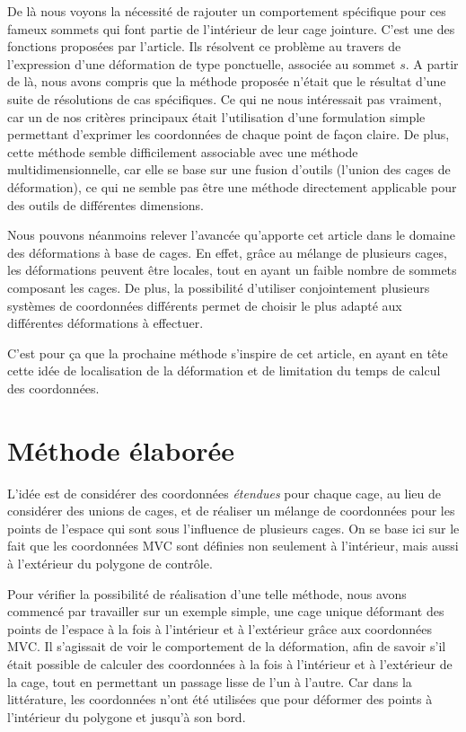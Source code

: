De là nous voyons la nécessité de rajouter un comportement spécifique
pour ces fameux sommets qui font partie de l'intérieur de leur cage
jointure. C'est une des fonctions proposées par l'article. Ils
résolvent ce problème au travers de l'expression d'une déformation de
type ponctuelle, associée au sommet $s$. A partir de là, nous avons
compris que la méthode proposée \cite{GPCP13} n'était que le résultat
d'une suite de résolutions de cas spécifiques. Ce qui ne nous
intéressait pas vraiment, car un de nos critères principaux était
l'utilisation d'une formulation simple permettant d'exprimer les
coordonnées de chaque point de façon claire. De plus, cette méthode
semble difficilement associable avec une méthode multidimensionnelle,
car elle se base sur une fusion d'outils (l'union des cages de
déformation), ce qui ne semble pas être une méthode directement
applicable pour des outils de différentes dimensions.

Nous pouvons néanmoins relever l'avancée qu'apporte cet article dans
le domaine des déformations à base de cages. En effet, grâce au
mélange de plusieurs cages, les déformations peuvent être locales,
tout en ayant un faible nombre de sommets composant les cages. De
plus, la possibilité d'utiliser conjointement plusieurs systèmes de
coordonnées différents permet de choisir le plus adapté aux
différentes déformations à effectuer.

C'est pour ça que la prochaine méthode s'inspire de cet article, en
ayant en tête cette idée de localisation de la déformation et de
limitation du temps de calcul des coordonnées.

\section{Méthode élaborée}
L'idée est de considérer des coordonnées \textit{étendues} pour chaque
cage, au lieu de considérer des unions de cages, et de réaliser un
mélange de coordonnées pour les points de l'espace qui sont sous
l'influence de plusieurs cages. On se base ici sur le fait que les
coordonnées MVC sont définies non seulement à l'intérieur, mais aussi
à l'extérieur du polygone de contrôle.

Pour vérifier la possibilité de réalisation d'une telle méthode, nous
avons commencé par travailler sur un exemple simple, une cage unique
déformant des points de l'espace à la fois à l'intérieur et à
l'extérieur grâce aux coordonnées MVC. Il s'agissait de voir le
comportement de la déformation, afin de savoir s'il était possible de
calculer des coordonnées à la fois à l'intérieur et à l'extérieur de
la cage, tout en permettant un passage lisse de l'un à l'autre. Car
dans la littérature, les coordonnées n'ont été utilisées que pour
déformer des points à l'intérieur du polygone et jusqu'à son bord.

